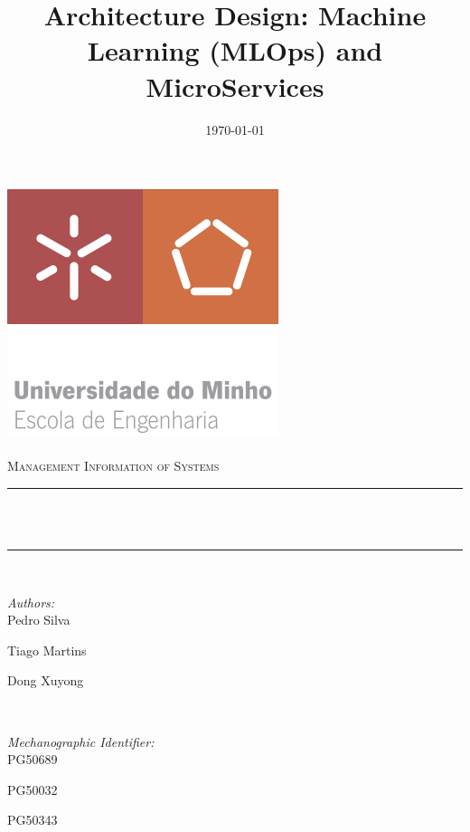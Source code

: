 \documentclass[12pt]{article}
\title{Architecture Design: Machine Learning (MLOps) and MicroServices}								%
\date{\today}											%
\makeatletter
\let\thetitle\@title
\let\thedate\@date
\makeatother
\begin{document}

\begin{titlepage}
	\centering
    \vspace*{0.5 cm}
    \includegraphics[scale = 0.75]{./assets/EEUMLOGO.png}\\[1.0 cm]	%
	\textsc{\Large}\\[0.5 cm]				%
	\textsc{\large Management Information of Systems}\\[0.5 cm]				%
	\rule{\linewidth}{0.2 mm} \\[0.4 cm]
	{ \huge \bfseries \thetitle}\\
	\rule{\linewidth}{0.2 mm} \\[1.5 cm]
	
	\begin{minipage}{0.4\textwidth}
		\begin{flushleft} \large
			\emph{Authors:}\\
			Pedro Silva
   
            Tiago Martins
            
            Dong Xuyong
			\end{flushleft}
			\end{minipage}~
			\begin{minipage}{0.4\textwidth}
			\begin{flushright} \large
			\emph{Mechanographic Identifier:} \\
			PG50689
   
            PG50032
            
            PG50343%
		\end{flushright}
	\end{minipage}\\[2 cm]
	
	{\large \thedate}\\[2 cm]
 
	\vfill
	
\end{titlepage}
\end{document}
